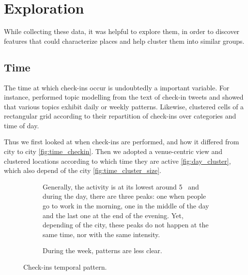 \section{Exploration}

While collecting these data, it was helpful to explore them, in order to
discover features that could characterize places and help cluster them into
similar groups.

\subsection{Time}

The time at which check-ins occur is undoubtedly a important variable. For
instance, \textcite{UrbanStory12} performed topic modelling from the text of
check-in tweets and showed that various topics exhibit daily or weekly
patterns. Likewise, \textcite{TimeCluster13} clustered cells of a rectangular
grid according to their repartition of check-ins over categories and time of
day.

Thus we first looked at when check-ins are performed, and how it differed from
city to city \autoref{fig:time_checkin}. Then we adopted a venue-centric view
and clustered locations according to which time they are active
\autoref{fig:day_cluster}, which also depend of the city
\autoref{fig:time_cluster_size}.

\begin{figure}[hbt]
    \begin{subfigure}[b]{\textwidth}
    \centering
    \iftoggle{EXTERNALPGF}{%
        \texttt{[image: daily\_checkin]}
    }{%
        
    }
    \caption[Pattern of check-in during the day]{Generally, the activity is at
    its lowest around 5 \am{}\ and during the day, there are three peaks: one
when people go to work in the morning, one in the middle of the day and the
last one at the end of the evening. Yet, depending of the city, these peaks do
not happen at the same time, nor with the same intensity.
\label{fig:daily_checkin}}
    \end{subfigure}

    \begin{subfigure}[b]{\textwidth}
    \centering
    \iftoggle{EXTERNALPGF}{%
        \texttt{[image: weekly\_checkin]}
    }{%
        
    }
    \caption[Pattern of check-in during the week]{During the week, patterns
        are less clear.  \label{fig:weekly_checkin}}
    \end{subfigure}
    \caption{Check-ins temporal pattern.\label{fig:time_checkin}}
\end{figure}

